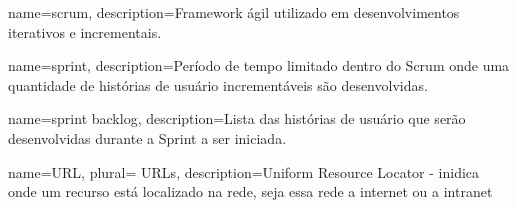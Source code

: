  {
    name=scrum,
    description={Framework ágil utilizado em desenvolvimentos iterativos
    e incrementais.}
}

 {
    name=sprint,
    description={Período de tempo limitado dentro do Scrum onde uma quantidade de histórias de usuário incrementáveis são desenvolvidas.}
}

 {
    name={sprint backlog},
    description={Lista das histórias de usuário que serão desenvolvidas durante a Sprint a ser iniciada.}
}

 {
	name=URL,
	plural= {URLs},
	description={Uniform Resource Locator - inidica onde um recurso está 				localizado na rede, seja essa rede a internet ou a intranet}
}


